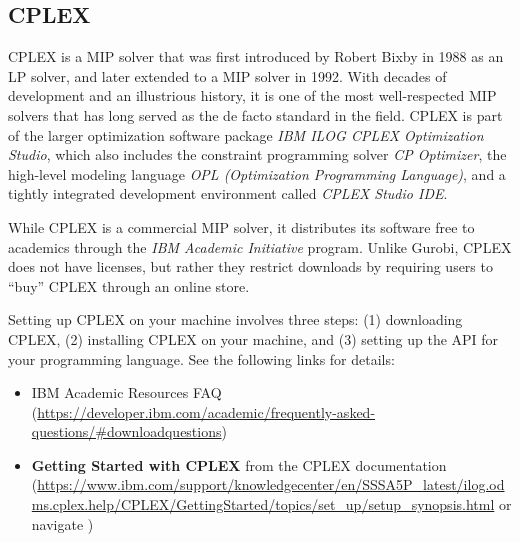 \documentclass[12pt]{article}
\begin{document}
\subsection{CPLEX}
CPLEX is a MIP solver that was first introduced by Robert Bixby in 1988 as an LP solver, and later extended to a MIP solver in 1992.
With decades of development and an illustrious history, it is one of the most well-respected MIP solvers that has long served as the de facto standard in the field.
CPLEX is part of the larger optimization software package \textit{IBM ILOG CPLEX Optimization Studio}, which also includes the constraint programming solver \textit{CP Optimizer}, the high-level modeling language \textit{OPL (Optimization Programming Language)}, and a tightly integrated development environment called \textit{CPLEX Studio IDE}.

While CPLEX is a commercial MIP solver, it distributes its software free to academics through the \emph{IBM Academic Initiative} program.
Unlike Gurobi, CPLEX does not have licenses, but rather they restrict downloads by requiring users to ``buy'' CPLEX through an online store.

Setting up CPLEX on your machine involves three steps: (1) downloading CPLEX, (2) installing CPLEX on your machine, and (3) setting up the API for your programming language.
See the following links for details:
\begin{itemize}
    \item IBM Academic Resources FAQ (\url{https://developer.ibm.com/academic/frequently-asked-questions/\#downloadquestions})
    \item \textbf{Getting Started with CPLEX} from the CPLEX documentation (\url{https://www.ibm.com/support/knowledgecenter/en/SSSA5P_latest/ilog.odms.cplex.help/CPLEX/GettingStarted/topics/set_up/setup_synopsis.html} or navigate )
\end{itemize}
\end{document}
